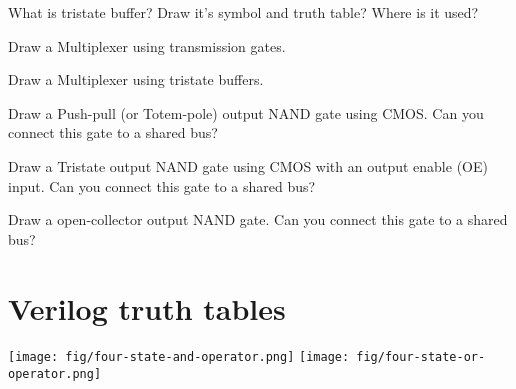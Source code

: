 \begin{definition}
  What is tristate buffer? Draw it's symbol and truth table? Where is it used?
\end{definition}
\vspace{10em}

\begin{example}
Draw a Multiplexer using transmission gates.
\end{example}
\vspace{10em}

\begin{example}
  Draw a Multiplexer using tristate buffers.
\end{example}
\vspace{10em}


\begin{definition}
  Draw a Push-pull (or Totem-pole) output NAND gate using CMOS. Can you connect
  this gate to a shared bus?
\end{definition}
\vspace{10em}

\begin{definition}[Tristate]
  Draw a Tristate output NAND gate using CMOS with an output enable (OE) input.
  Can you connect this gate to a shared bus?
\end{definition}
\vspace{10em}

\begin{definition}
  Draw a open-collector output NAND gate. Can you connect this gate to a shared bus?
\end{definition}
\vspace{10em}

\section{Verilog truth tables}

\texttt{[image: fig/four-state-and-operator.png]}
\texttt{[image: fig/four-state-or-operator.png]}

